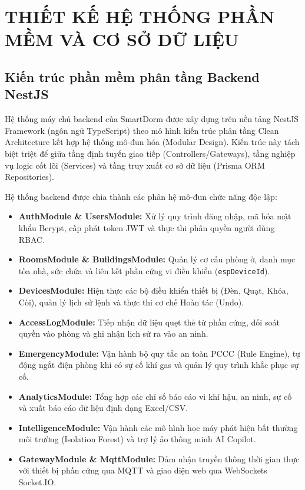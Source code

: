 \chapter{THIẾT KẾ HỆ THỐNG PHẦN MỀM VÀ CƠ SỞ DỮ LIỆU}
\label{ch:chuong3}

\section{Kiến trúc phần mềm phân tầng Backend NestJS}
\label{sec:kien_truc_backend}

Hệ thống máy chủ backend của SmartDorm được xây dựng trên nền tảng NestJS Framework (ngôn ngữ TypeScript) theo mô hình kiến trúc phân tầng Clean Architecture kết hợp hệ thống mô-đun hóa (Modular Design). Kiến trúc này tách biệt triệt để giữa tầng định tuyến giao tiếp (Controllers/Gateways), tầng nghiệp vụ logic cốt lõi (Services) và tầng truy xuất cơ sở dữ liệu (Prisma ORM Repositories).

Hệ thống backend được chia thành các phân hệ mô-đun chức năng độc lập:
\begin{itemize}
    \item \textbf{AuthModule \& UsersModule:} Xử lý quy trình đăng nhập, mã hóa mật khẩu Bcrypt, cấp phát token JWT và thực thi phân quyền người dùng RBAC.
    \item \textbf{RoomsModule \& BuildingsModule:} Quản lý cơ cấu phòng ở, danh mục tòa nhà, sức chứa và liên kết phần cứng vi điều khiển (\texttt{espDeviceId}).
    \item \textbf{DevicesModule:} Hiện thực các bộ điều khiển thiết bị (Đèn, Quạt, Khóa, Còi), quản lý lịch sử lệnh và thực thi cơ chế Hoàn tác (Undo).
    \item \textbf{AccessLogModule:} Tiếp nhận dữ liệu quẹt thẻ từ phần cứng, đối soát quyền vào phòng và ghi nhận lịch sử ra vào an ninh.
    \item \textbf{EmergencyModule:} Vận hành bộ quy tắc an toàn PCCC (Rule Engine), tự động ngắt điện phòng khi có sự cố khí gas và quản lý quy trình khắc phục sự cố.
    \item \textbf{AnalyticsModule:} Tổng hợp các chỉ số báo cáo vi khí hậu, an ninh, sự cố và xuất báo cáo dữ liệu định dạng Excel/CSV.
    \item \textbf{IntelligenceModule:} Vận hành các mô hình học máy phát hiện bất thường môi trường (Isolation Forest) và trợ lý ảo thông minh AI Copilot.
    \item \textbf{GatewayModule \& MqttModule:} Đảm nhận truyền thông thời gian thực với thiết bị phần cứng qua MQTT và giao diện web qua WebSockets Socket.IO.
\end{itemize}

